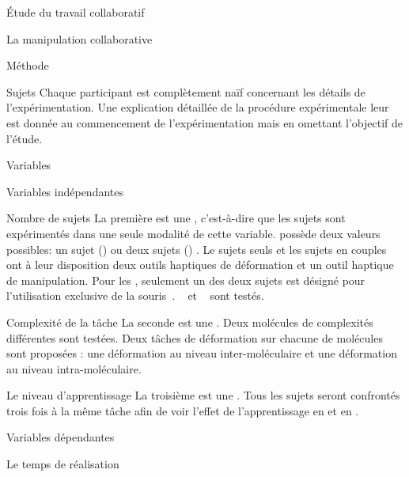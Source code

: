 \documentclass[myfrancais]{mythesis}
\begin{document}
\begin{mypart}{Étude du travail collaboratif}
\begin{mychapter}{La manipulation collaborative}
\begin{mysection}{Méthode}
\begin{mysubsection}{Sujets}
					Chaque participant est complètement naïf concernant les détails de l'expérimentation.
					Une explication détaillée de la procédure expérimentale leur est donnée au commencement de l'expérimentation mais en omettant l'objectif de l'étude.
				\end{mysubsection}
				\begin{mysubsection}{Variables}
					\begin{mysubsubsection}{Variables indépendantes}
						\begin{myparagraph}{ Nombre de sujets}
							La première  est une , c'est-à-dire que les sujets sont expérimentés dans une seule modalité de cette variable.
							 possède deux valeurs possibles: \og un sujet (\mycf {}) \fg ou \og deux sujets (\mycf {}) \fg.
							Le sujets seuls et les sujets en couples ont à leur disposition deux outils haptiques de déformation et un outil haptique de manipulation.
							Pour les , seulement un des deux sujets est désigné pour l'utilisation exclusive de la souris~\myThreeD.
							\mynum{12}~ et ~ sont testés.
						\end{myparagraph}
						\begin{myparagraph}{ Complexité de la tâche}
							La seconde  est une .
							Deux molécules de complexités différentes sont testées.
							Deux tâches de déformation sur chacune de molécules sont proposées : une déformation au niveau inter-moléculaire et une déformation au niveau intra-moléculaire.
						\end{myparagraph}
						\begin{myparagraph}{ Le niveau d'apprentissage}
							La troisième  est une .
							Tous les sujets seront confrontés trois fois à la même tâche afin de voir l'effet de l'apprentissage en  et en .
						\end{myparagraph}
					\end{mysubsubsection}
					\begin{mysubsubsection}{Variables dépendantes}
						\begin{myparagraph}{ Le temps de réalisation}

\end{myparagraph}
\end{mysubsubsection}
\end{mysubsection}
\end{mysection}
\end{mychapter}
\end{mypart}
\end{document}
